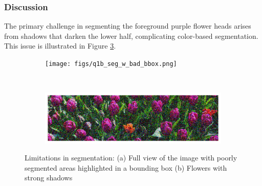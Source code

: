 \documentclass[11pt]{article}
\begin{document}
\subsubsection{Discussion}
The primary challenge in segmenting the foreground purple flower heads arises from shadows that darken the lower half, complicating color-based segmentation. This issue is illustrated in Figure \ref{fig:q1b_seg_lim}.
\begin{figure}[H]
    \centering
    \begin{subfigure}{.8\textwidth}
        \centering
        \texttt{[image: figs/q1b\_seg\_w\_bad\_bbox.png]}
        \caption{}  %
        \label{fig:q1b_bad_seg_w_bbox}
    \end{subfigure}\\ %
    \begin{subfigure}{.8\textwidth}
        \centering
        \includegraphics[width=\linewidth]{figs/q1b_bad_zoomed_region.png}
        \caption{}  %
        \label{fig:q1b_bad_zoom}
    \end{subfigure}
    \caption{Limitations in segmentation: (a) Full view of the image with poorly segmented areas highlighted in a bounding box (b) Flowers with strong shadows}
    \label{fig:q1b_seg_lim}
\end{figure}
\end{document}
